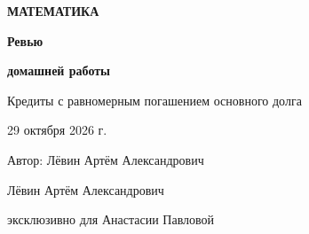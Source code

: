 \documentclass[a4paper,12pt]{article}
\begin{document}
\begin{titlepage}
\thispagestyle{empty}
\centering
\vspace*{36mm}
{\small\bfseries\color{accent}МАТЕМАТИКА\par}
\vspace{13mm}
{\Huge\bfseries\color{dark}Ревью\par}
\vspace{2mm}
{\LARGE\bfseries\color{dark}домашней работы\par}
\vspace{9mm}
{\large Кредиты с равномерным погашением основного долга\par}
\vspace{23mm}
{\large 29 октября 2026 г.\par}
\vspace{18mm}
{\normalsize Автор: Лёвин Артём Александрович\par}
\vfill
{\small\color{muted}Лёвин Артём Александрович\par}
{\small\color{muted}эксклюзивно для Анастасии Павловой\par}
\vspace{8mm}
\end{titlepage}
\setcounter{page}{2}
\end{document}

